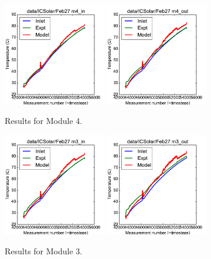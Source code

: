 \documentclass{article}
\begin{document}
\clearpage
\begin{figure}[!ht]
\centering
\includegraphics[width=0.4\textwidth]{../../data/ICSolar/images/Feb27_m4_in_unsteady.pdf}\hspace{0.05\textwidth}
\includegraphics[width=0.4\textwidth]{../../data/ICSolar/images/Feb27_m4_out_unsteady.pdf}\hspace{0.05\textwidth}\\
\caption{Results for Module 4.}\end{figure}
\begin{figure}[!ht]
\centering
\includegraphics[width=0.4\textwidth]{../../data/ICSolar/images/Feb27_m3_in_unsteady.pdf}\hspace{0.05\textwidth}
\includegraphics[width=0.4\textwidth]{../../data/ICSolar/images/Feb27_m3_out_unsteady.pdf}\hspace{0.05\textwidth}\\
\caption{Results for Module 3.}\end{figure}
\end{document}
